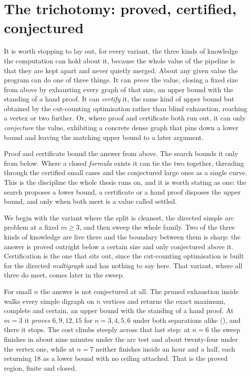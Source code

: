 \section{The trichotomy: proved, certified, conjectured}
\label{sec:trichotomy}

It is worth stopping to lay out, for every variant, the three kinds of knowledge the computation can hold about it, because the whole value of the pipeline is that they are kept apart and never quietly merged. About any given value the program can do one of three things. It can \emph{prove} the value, closing a fixed size from above by exhausting every graph of that size, an upper bound with the standing of a hand proof. It can \emph{certify} it, the same kind of upper bound but obtained by the cut-counting optimisation rather than blind exhaustion, reaching a vertex or two further. Or, where proof and certificate both run out, it can only \emph{conjecture} the value, exhibiting a concrete dense graph that pins down a lower bound and leaving the matching upper bound to a later argument.

Proof and certificate bound the answer from above. The search bounds it only from below. Where a closed \emph{formula} exists it can tie the two together, threading through the certified small cases and the conjectured large ones as a single curve. This is the discipline the whole thesis runs on, and it is worth stating as one: the search proposes a lower bound, a certificate or a hand proof disposes the upper bound, and only when both meet is a value called settled.

We begin with the variant where the split is cleanest, the directed simple arc problem at a fixed $m \ge 3$, and then sweep the whole family. Two of the three kinds of knowledge are live there and the boundary between them is sharp: the answer is proved outright below a certain size and only conjectured above it. Certification is the one that sits out, since the cut-counting optimisation is built for the directed \emph{multigraph} and has nothing to say here. That variant, where all three do meet, comes later in the sweep.

For small $n$ the answer is not conjectured at all. The pruned exhaustion inside  walks every simple digraph on $n$ vertices and returns the exact maximum, complete and certain, an upper bound with the standing of a hand proof. At $m = 3$ it \emph{proves} $6, 9, 12, 15$ for $n = 3, 4, 5, 6$ under both separations alike (), and there it stops. The cost climbs steeply across that last step: at $n = 6$ the sweep finishes in about nine minutes under the arc test and about twenty-four under the vertex one, while at $n = 7$ neither finishes inside an hour and a half, each returning $18$ as a lower bound with no ceiling attached. That is the proved region, finite and closed.

